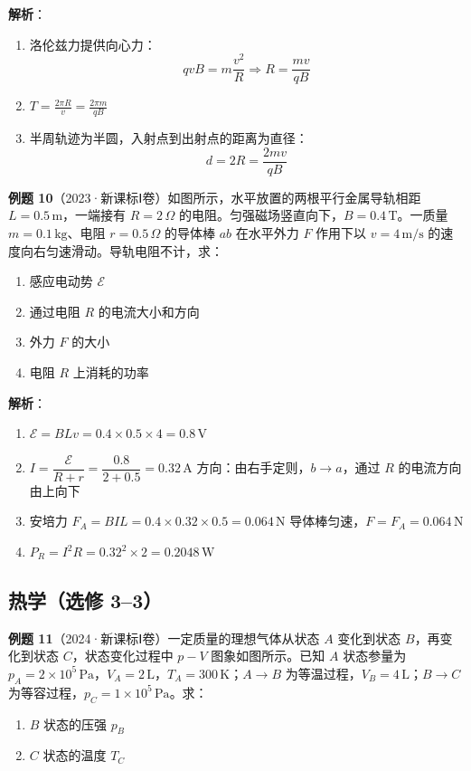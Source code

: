 \textbf{解析}：
\begin{enumerate}
  \item 洛伦兹力提供向心力：
  \[
  qvB = m\frac{v^2}{R} \Rightarrow R = \frac{mv}{qB}
  \]
  \item $T = \frac{2\pi R}{v} = \frac{2\pi m}{qB}$
  \item 半周轨迹为半圆，入射点到出射点的距离为直径：
  \[
  d = 2R = \frac{2mv}{qB}
  \]
\end{enumerate}

\vspace{1em}

\textbf{例题 10}（2023·新课标Ⅰ卷）如图所示，水平放置的两根平行金属导轨相距 $L = 0.5\,\text{m}$，一端接有 $R = 2\,\Omega$ 的电阻。匀强磁场竖直向下，$B = 0.4\,\text{T}$。一质量 $m = 0.1\,\text{kg}$、电阻 $r = 0.5\,\Omega$ 的导体棒 $ab$ 在水平外力 $F$ 作用下以 $v = 4\,\text{m/s}$ 的速度向右匀速滑动。导轨电阻不计，求：
\begin{enumerate}
  \item 感应电动势 $\mathcal{E}$
  \item 通过电阻 $R$ 的电流大小和方向
  \item 外力 $F$ 的大小
  \item 电阻 $R$ 上消耗的功率
\end{enumerate}

\textbf{解析}：
\begin{enumerate}
  \item $\mathcal{E} = BLv = 0.4 \times 0.5 \times 4 = 0.8\,\text{V}$
  \item $I = \dfrac{\mathcal{E}}{R+r} = \dfrac{0.8}{2+0.5} = 0.32\,\text{A}$
  方向：由右手定则，$b\to a$，通过 $R$ 的电流方向由上向下
  \item 安培力 $F_A = BIL = 0.4 \times 0.32 \times 0.5 = 0.064\,\text{N}$
  导体棒匀速，$F = F_A = 0.064\,\text{N}$
  \item $P_R = I^2R = 0.32^2 \times 2 = 0.2048\,\text{W}$
\end{enumerate}

\subsection{热学（选修 3--3）}

\textbf{例题 11}（2024·新课标Ⅰ卷）一定质量的理想气体从状态 $A$ 变化到状态 $B$，再变化到状态 $C$，状态变化过程中 $p-V$ 图象如图所示。已知 $A$ 状态参量为 $p_A = 2\times10^5\,\text{Pa}$，$V_A = 2\,\text{L}$，$T_A = 300\,\text{K}$；$A\to B$ 为等温过程，$V_B = 4\,\text{L}$；$B\to C$ 为等容过程，$p_C = 1\times10^5\,\text{Pa}$。求：
\begin{enumerate}
  \item $B$ 状态的压强 $p_B$
  \item $C$ 状态的温度 $T_C$
\end{enumerate}

